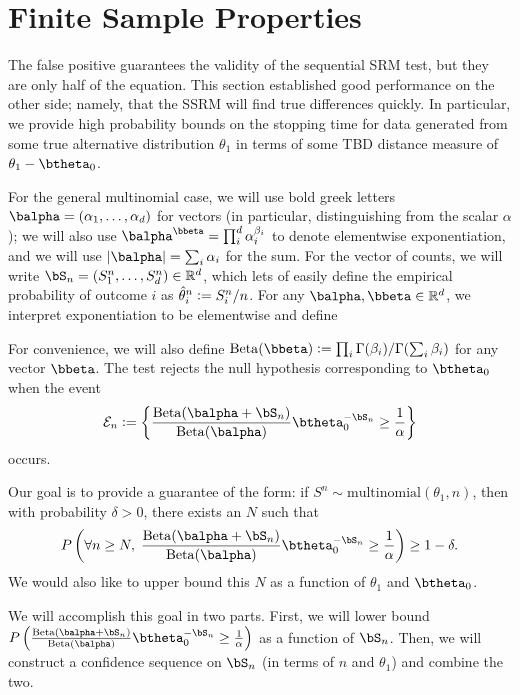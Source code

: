 \documentclass[11pt]{article}
\newcommand{\Reals}{\mathbb R}
\newcommand{\Beta}{\mathrm{Beta}}
\newcommand{\df}{\vcentcolon=}
\begin{document}
\section{Finite Sample Properties}
\label{app:finite_sample}
The false positive guarantees the validity of the sequential SRM test, but they are only half of the equation.
This section established good performance on the other side; namely, that the SSRM will find true differences quickly.
In particular, we provide high probability bounds on the stopping time for data generated from some true alternative distribution $\theta_1$ in terms of some TBD distance measure of $\theta_1 - \btheta_0$.

For the general multinomial case, we will use bold greek letters $\balpha = (\alpha_1,\ldots, \alpha_d)$ for vectors (in particular, distinguishing from the scalar $\alpha$); we will also use $\balpha^\bbeta = \prod_{i}^d \alpha_i^{\beta_i}$ to denote elementwise exponentiation, and we will use $|\balpha| = \sum_i\alpha_i$ for the sum.
For the vector of counts, we will write $\bS_n=(S_1^n,\ldots, S_d^n)\in\Reals^d$, which lets of easily define the empirical probability of outcome $i$ as $\hat \theta_i^n \df S^n_i/n$.
For any $\balpha,\bbeta\in\Reals^d$, we interpret exponentiation to be elementwise and define 

For convenience, we will also define $\Beta(\bbeta) \df \prod_i \Gamma(\beta_i) / \Gamma(\sum_i\beta_i)$ for any vector $\bbeta$.
The test rejects the null hypothesis corresponding to $\btheta_0$ when the event
\begin{equation}\label{eq:multinomial.rejection.region}
  \mathcal E_n \df \left\{\frac{\Beta(\balpha + \bS_n)}
  {\Beta(\balpha)}
  \btheta_0 ^{-\bS_n} \geq \frac{1}{\alpha}\right\}
\end{equation}
occurs.

Our goal is to provide a guarantee of the form: if $S^n\sim\mathrm{multinomial}(\theta_1,n)$, then with probability $\delta>0$, there exists an $N$ such that 
\begin{equation*}
  P \left(\forall n \geq N,\;
      \frac{\Beta(\balpha + \bS_n)}
  {\Beta(\balpha)}
  \btheta_0 ^{-\bS_n} \geq \frac{1}{\alpha}
  \right) \geq 1-\delta.
\end{equation*}
We would also like to upper bound this $N$ as a function of $\theta_1$ and $\btheta_0$.

We will accomplish this goal in two parts.
First, we will lower bound 
$
  P \left(
      \frac{\Beta(\balpha + \bS_n)}
  {\Beta(\balpha)}
  \btheta_0 ^{-\bS_n} \geq \frac{1}{\alpha}
  \right) 
$
as a function of $\bS_n$.
Then, we will construct a confidence sequence on $\bS_n$ (in terms of $n$ and $\theta_1$) and combine the two.
\end{document}
